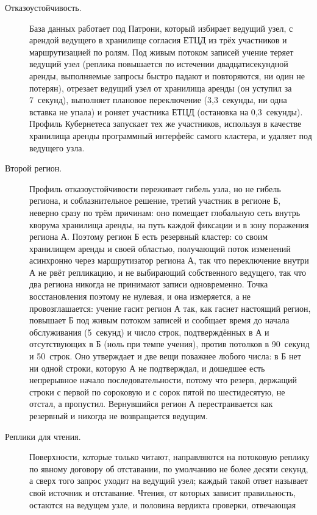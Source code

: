 \begin{description}
  \item[Отказоустойчивость.] База данных работает под Патрони, который избирает ведущий узел, с арендой
    ведущего в хранилище согласия ЕТЦД из трёх участников и маршрутизацией по ролям. Под живым потоком записей учение теряет ведущий узел
    (реплика повышается по истечении двадцатисекундной аренды, выполняемые запросы быстро падают и
    повторяются, ни один не потерян), отрезает ведущий узел от хранилища аренды (он уступил за
    7~секунд), выполняет плановое переключение (3,3~секунды, ни одна вставка не упала) и роняет
    участника ЕТЦД (остановка на 0,3~секунды). Профиль Кубернетеса запускает тех же участников,
    используя в качестве хранилища аренды программный интерфейс самого кластера, и удаляет под
    ведущего узла. \sImpl
  \item[Второй регион.] Профиль отказоустойчивости переживает гибель узла, но не гибель региона, и
    соблазнительное решение, третий участник в регионе Б, неверно сразу по трём причинам: оно
    помещает глобальную сеть внутрь кворума хранилища аренды, на путь каждой фиксации и в зону
    поражения региона А. Поэтому регион Б есть резервный кластер: со своим
    хранилищем аренды и своей областью, получающий поток изменений асинхронно через маршрутизатор
    региона А, так что переключение внутри А не рвёт репликацию, и не выбирающий собственного
    ведущего, так что два региона никогда не принимают записи одновременно. Точка восстановления
    поэтому не нулевая, и она измеряется, а не провозглашается: учение гасит регион А так, как гаснет
    настоящий регион, повышает Б под живым потоком записей и сообщает время до начала обслуживания
    (5~секунд) и число строк, подтверждённых в А и отсутствующих в Б (ноль при темпе учения), против
    потолков в 90~секунд и 50~строк. Оно утверждает и две вещи поважнее любого числа: в Б нет ни
    одной строки, которую А не подтверждал, и дошедшее есть непрерывное начало последовательности,
    потому что резерв, держащий строки с первой по сороковую и с сорок пятой по шестидесятую, не
    отстал, а пропустил. Вернувшийся регион А перестраивается как резервный и никогда не
    возвращается ведущим. \sImpl
  \item[Реплики для чтения.] Поверхности, которые только читают, направляются на потоковую реплику
    по явному договору об отставании, по умолчанию не более десяти секунд, а сверх того запрос
    уходит на ведущий узел; каждый такой ответ называет свой источник и отставание. Чтения, от
    которых зависит правильность, остаются на ведущем узле, и половина вердикта проверки, отвечающая

\end{description}
